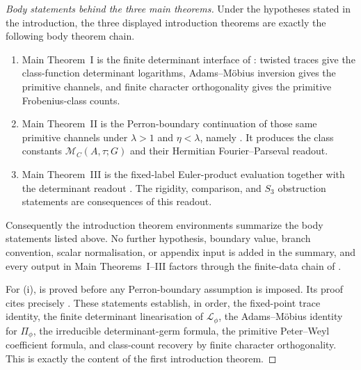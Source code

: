 \documentclass[11pt,a4paper]{amsart}
\theoremstyle{plain}
\theoremstyle{definition}
\theoremstyle{remark}
\begin{document}
\begin{proof}[Body statements behind the three main theorems]
  Under the hypotheses stated in the introduction, the three displayed
  introduction theorems are exactly the following body theorem chain.
  \begin{enumerate}[label=\textup{(\roman*)},leftmargin=*]
    \item Main Theorem~I is the finite determinant interface of
    : twisted traces give the
    class-function determinant logarithms, Adams--M\"obius inversion gives
    the primitive channels, and finite character orthogonality gives the
    primitive Frobenius-class counts.
    \item Main Theorem~II is the Perron-boundary continuation of those same
    primitive channels under \(\lambda>1\) and \(\eta<\lambda\), namely
    .
    It produces the class constants \(\mathcal M_C(A,\tau;G)\) and their
    Hermitian Fourier--Parseval readout.
    \item Main Theorem~III is the fixed-label Euler-product evaluation
     together with the determinant
    readout
    .
    The rigidity, comparison, and \(S_3\) obstruction statements are
    consequences of this readout.
  \end{enumerate}
  Consequently the introduction theorem environments summarize the body
  statements listed above.  No further hypothesis, boundary value, branch
  convention, scalar normalisation, or appendix input is added in the summary,
  and every output in Main Theorems~I--III factors through the finite-data chain
  of .

  For \textup{(i)},  is proved before
  any Perron-boundary assumption is imposed.  Its proof cites precisely
  .
  These statements establish, in order, the fixed-point trace identity, the
  finite determinant linearisation of \(\mathcal L_\phi\), the Adams--M\"obius
  identity for \(\Pi_\phi\), the irreducible determinant-germ formula, the
  primitive Peter--Weyl coefficient formula, and class-count recovery by finite
  character orthogonality.  This is exactly the content of the first
  introduction theorem.


\end{proof}
\end{document}
